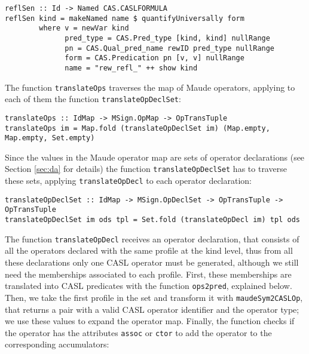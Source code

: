 {\codesize
\begin{verbatim}
reflSen :: Id -> Named CAS.CASLFORMULA
reflSen kind = makeNamed name $ quantifyUniversally form
        where v = newVar kind
              pred_type = CAS.Pred_type [kind, kind] nullRange
              pn = CAS.Qual_pred_name rewID pred_type nullRange
              form = CAS.Predication pn [v, v] nullRange
              name = "rew_refl_" ++ show kind
\end{verbatim}
}

The function \verb"translateOps" traverses the map of Maude operators,
applying to each of them the function \verb"translateOpDeclSet":

{\codesize
\begin{verbatim}
translateOps :: IdMap -> MSign.OpMap -> OpTransTuple
translateOps im = Map.fold (translateOpDeclSet im) (Map.empty, Map.empty, Set.empty)
\end{verbatim}
}

Since the values in the Maude operator map are sets of operator declarations
(see Section \ref{sec:da} for details)
the function \verb"translateOpDeclSet" has to traverse these sets, applying
\verb"translateOpDecl" to each operator declaration:

{\codesize
\begin{verbatim}
translateOpDeclSet :: IdMap -> MSign.OpDeclSet -> OpTransTuple -> OpTransTuple
translateOpDeclSet im ods tpl = Set.fold (translateOpDecl im) tpl ods
\end{verbatim}
}

The function \verb"translateOpDecl" receives an operator declaration,
that consists of all the operators declared with the same profile at
the kind level, thus from all these declarations only one CASL operator
must be generated, although we still need the memberships associated
to each profile. First, these memberships are translated into CASL
predicates with the function \verb"ops2pred", explained below.
Then, we take the first profile in the set and transform
it with \verb"maudeSym2CASLOp", that returns a pair with a valid CASL
operator identifier and the operator type; we use these values
to expand the operator map. Finally, the function checks if the operator
has the attributes \texttt{assoc} or \texttt{ctor} to add the
operator to the corresponding accumulators:

